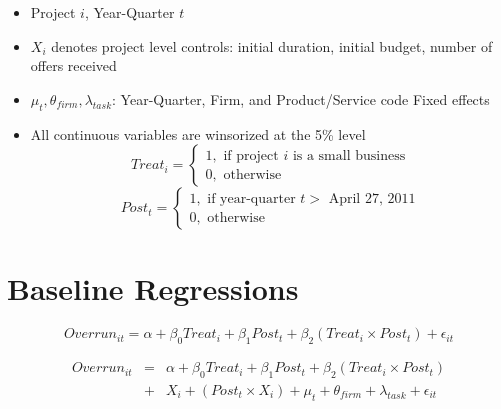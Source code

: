 \documentclass[
]{article}
\providecommand{\tightlist}{%
  \setlength{\itemsep}{0pt}\setlength{\parskip}{0pt}}
\begin{document}
\begin{itemize}
\tightlist
\item
  Project \(i\), Year-Quarter \(t\)
\item
  \(X_i\) denotes project level controls: initial duration, initial
  budget, number of offers received
\item
  \(\mu_t,\theta_{firm},\lambda_{task}\): Year-Quarter, Firm, and
  Product/Service code Fixed effects
\item
  All continuous variables are winsorized at the 5\% level
  \[ Treat_i = \begin{cases} 1, \text{ if project } i \text{ is a small business}\\
  0, \text{ otherwise} \end{cases}\]
  \[ Post_t = \begin{cases} 1, \text{ if year-quarter } t > \text{ April 27, 2011}\\
  0, \text{ otherwise} \end{cases}\]
\end{itemize}

\hypertarget{baseline-regressions}{%
\section{Baseline Regressions}\label{baseline-regressions}}

\[ Overrun_{it} = \alpha+\beta_0 Treat_i + \beta_1 Post_t + \beta_2 (Treat_i \times Post_t) + \epsilon_{it}\]

\[ \begin{aligned} Overrun_{it} &=& \alpha+\beta_0 Treat_i + \beta_1 Post_t + \beta_2 (Treat_i \times Post_t)\\
&+&  X_i + (Post_t \times X_i) + \mu_t + \theta_{firm} + \lambda_{task}+ \epsilon_{it}
\end{aligned}\]
\end{document}
